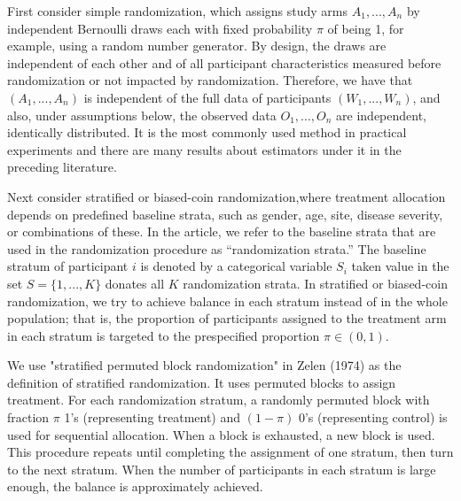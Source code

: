 \documentclass{article}
\begin{document}
First consider simple randomization, which assigns study arms $A_1, . . . ,A_n$ by independent Bernoulli draws each with fixed probability $\pi$ of being 1, for example, using a random number generator. 
By design, the draws are independent of each other and of all participant characteristics measured before randomization or not impacted by randomization. Therefore, we have that $(A_1, . . . ,A_n)$ is independent of the full data of participants $(W_1, . . . ,W_n)$, and also, under assumptions below, the observed data $O_1, . . . ,O_n$ are independent, identically distributed.
It is the most commonly used method in practical experiments and there are many results about estimators under it in the preceding literature.  

Next consider stratified or biased-coin randomization,where treatment allocation depends on predefined baseline strata, such as gender, age, site, disease severity, or combinations of these.
In the article, we refer to the baseline strata that are used in the randomization procedure as “randomization strata.”
The baseline stratum of participant $i$ is denoted by a categorical variable $S_i$ taken value in the set $S = \{ 1,...,K\}$ donates all $K$ randomization strata.
In stratified or biased-coin randomization, we try to achieve balance in each stratum instead of in the whole population; that is, the proportion of participants assigned to the treatment arm in each stratum is targeted to the prespecified proportion $\pi \in (0,1)$.

We use "stratified permuted block randomization" in Zelen (1974)\cite{zelen1974randomization} as the definition of stratified randomization.
It uses permuted blocks to assign treatment. 
For each randomization stratum, a randomly permuted block with fraction $\pi$ 1’s (representing treatment) and $(1-\pi)$ 0’s (representing control) is used for sequential allocation.
When a block is exhausted, a new block is used.
This procedure repeats until completing the assignment of one stratum, then turn to the next stratum.
When the number of participants in each stratum is large enough, the balance is approximately achieved.
\end{document}
